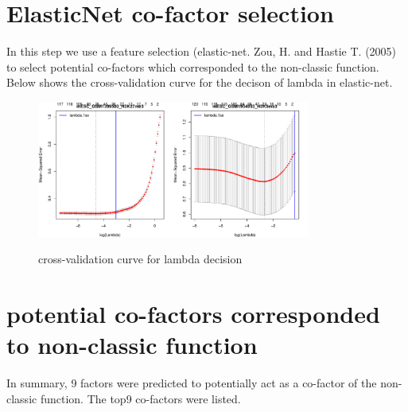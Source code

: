 \documentclass[11pt,a4paper]{article}
\begin{document}
\section{ElasticNet co-factor selection}
In this step we use a feature selection (elastic-net. Zou, H. and Hastie T. (2005) to select potential co-factors which corresponded to the non-classic function. Below shows the cross-validation curve for the decison of lambda in elastic-net.  
\begin{figure}[h]
        \caption{cross-validation curve for lambda decision} \label{fig:profileunion}
        \setlength{\abovecaptionskip}{0pt}
        \setlength{\belowcaptionskip}{10pt}
        \centering
        {\includegraphics[width=0.8\textwidth]{test6_elnet_lambdaSelection.pdf}}
\end{figure}

\newpage
\newpage
\section{potential co-factors corresponded to non-classic function}
In summary, 9 factors were predicted to potentially act as a co-factor of the non-classic function. The top9 co-factors were listed.
\end{document}
